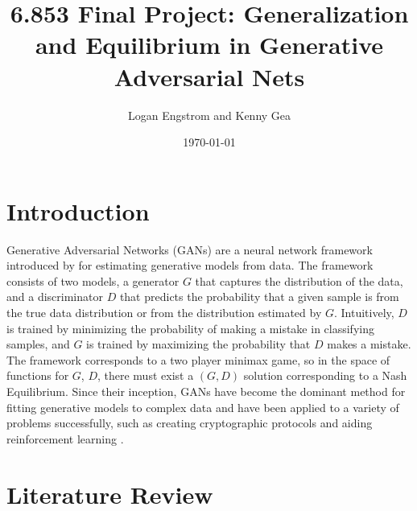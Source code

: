 \documentclass{article}
\title{6.853 Final Project: Generalization and Equilibrium in Generative Adversarial Nets}
\author{Logan Engstrom and Kenny Gea}
\date{\today}
\begin{document}
\maketitle
\section{Introduction}
Generative Adversarial Networks (GANs) are a neural network framework introduced by \citet{Goodfellow2014} for estimating generative models from data. The framework consists of two models, a generator $G$ that captures the distribution of the data, and a discriminator $D$ that predicts the probability that a given sample is from the true data distribution or from the distribution estimated by $G$. Intuitively, $D$ is trained by minimizing the probability of making a mistake in classifying samples, and $G$ is trained by maximizing the probability that $D$ makes a mistake. The framework corresponds to a two player minimax game, so in the space of functions for $G$, $D$, there must exist a $(G,D)$ solution corresponding to a Nash Equilibrium. Since their inception, GANs have become the dominant method for fitting generative models to complex data \citep{Arora17} and have been applied to a variety of problems successfully, such as creating cryptographic protocols \citep{Abadi16} and aiding reinforcement learning \citep{FinnGL16}.

\section{Literature Review}
\end{document}
